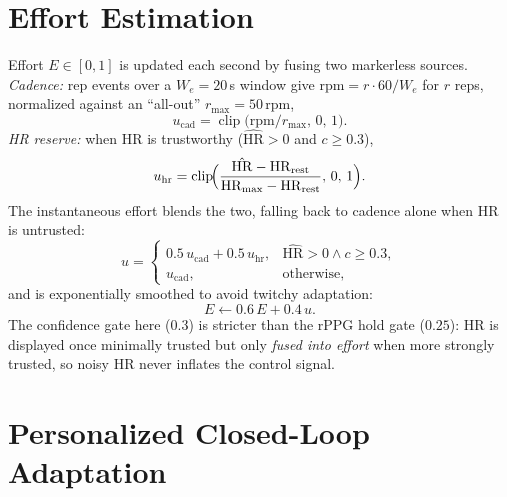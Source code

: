 \documentclass[journal,10pt]{IEEEtran}
\newcommand{\hmax}{\mathrm{HR}_{\max}}
\newcommand{\hrrest}{\mathrm{HR}_{\mathrm{rest}}}
\newcommand{\clip}{\operatorname{clip}}
\begin{document}
\section{Effort Estimation}\label{sec:effort}
Effort $E\in[0,1]$ is updated each second by fusing two markerless sources.
\emph{Cadence:} rep events over a $W_e=20$\,s window give
$\mathrm{rpm}=r\cdot 60/W_e$ for $r$ reps, normalized against an ``all-out''
$r_{\max}=50$\,rpm,
\begin{equation}
u_{\text{cad}}=\clip\!\bigl(\mathrm{rpm}/r_{\max},\,0,\,1\bigr).
\end{equation}
\emph{HR reserve:} when HR is trustworthy ($\hat{\mathrm{HR}}>0$ and $c\ge0.3$),
\begin{equation}
u_{\text{hr}}=\clip\!\Bigl(\frac{\hat{\mathrm{HR}}-\hrrest}{\hmax-\hrrest},\,0,\,1\Bigr).
\end{equation}
The instantaneous effort blends the two, falling back to cadence alone when HR is
untrusted:
\begin{equation}
u=\begin{cases}
0.5\,u_{\text{cad}}+0.5\,u_{\text{hr}}, & \hat{\mathrm{HR}}>0 \wedge c\ge 0.3,\\[2pt]
u_{\text{cad}}, & \text{otherwise},
\end{cases}
\end{equation}
and is exponentially smoothed to avoid twitchy adaptation:
\begin{equation}
E\leftarrow 0.6\,E + 0.4\,u.
\end{equation}
The confidence gate here ($0.3$) is stricter than the rPPG hold gate ($0.25$):
HR is displayed once minimally trusted but only \emph{fused into effort} when more
strongly trusted, so noisy HR never inflates the control signal.

\section{Personalized Closed-Loop Adaptation}\label{sec:control}
\end{document}

